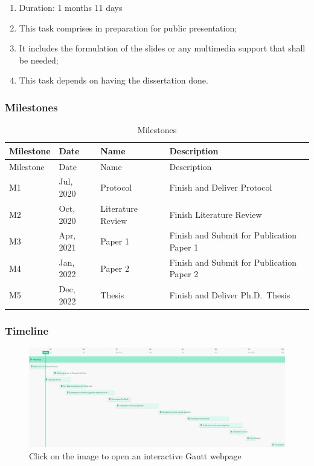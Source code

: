 \documentclass[runningheads]{llncs}
\providecommand{\tightlist}{%
  \setlength{\itemsep}{0pt}\setlength{\parskip}{0pt}}
\begin{document}
\begin{itemize}
  \begin{enumerate}
  \def\labelenumi{\arabic{enumi}.}
  \tightlist
  \item
    Duration: 1 months 11 days
  \item
    This task comprises in preparation for public presentation;
  \item
    It includes the formulation of the slides or any multimedia support
    that shall be needed;
  \item
    This task depends on having the dissertation done.
  \end{enumerate}
\end{itemize}

\hypertarget{milestones}{%
\subsubsection{Milestones}\label{milestones}}

\begin{longtable}[]{@{}llll@{}}
\caption{Milestones}\tabularnewline
\toprule
Milestone & Date & Name & Description \\
\midrule
\endfirsthead
\toprule
Milestone & Date & Name & Description \\
\midrule
\endhead
M1 & Jul, 2020 & Protocol & Finish and Deliver Protocol \\
M2 & Oct, 2020 & Literature Review & Finish Literature Review \\
M3 & Apr, 2021 & Paper 1 & Finish and Submit for Publication Paper 1 \\
M4 & Jan, 2022 & Paper 2 & Finish and Submit for Publication Paper 2 \\
M5 & Dec, 2022 & Thesis & Finish and Deliver Ph.D.~Thesis \\
\bottomrule
\end{longtable}

\hypertarget{timeline}{%
\subsubsection{Timeline}\label{timeline}}

\begin{figure}
\includegraphics[width=1\linewidth]{timeline} \caption{Click on the image to open an interactive Gantt webpage}\label{fig:timeline}
\end{figure}
\end{document}
